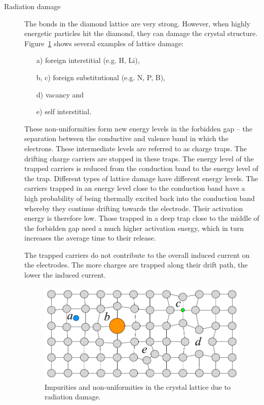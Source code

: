 \begin{description}
\item[Radiation damage]
The bonds in the diamond lattice are very strong. However, when highly energetic particles hit the diamond, they can damage the crystal structure. Figure~\ref{fig:raddamage} shows several examples of lattice damage:
\begin{enumerate}
\item[a)]foreign interstitial (e.g. H, Li),
\item[b, c)]foreign substitutional (e.g. N, P, B),
\item[d)]vacancy and
\item[e)]self interstitial.
\end{enumerate} 
These non-uniformities form new energy levels in the forbidden gap -- the separation between the conductive and valence band in which the electrons. These intermediate levels are referred to as charge traps. The drifting charge carriers are stopped in these traps. The energy level of the trapped carriers is reduced from the conduction band to the energy level of the trap. Different types of lattice damage have different energy levels. The carriers trapped in an energy level close to the conduction band have a high probability of being thermally excited back into the conduction band whereby they continue drifting towards the electrode. Their activation energy is therefore low. Those trapped in a deep trap close to the middle of the forbidden gap need a much higher activation energy, which in turn increases the average time to their release. 

The trapped carriers do not contribute to the overall induced current on the electrodes. The more charges are trapped along their drift path, the lower the induced current.

\begin{figure}[!t]
\begin{center}
\includegraphics[width=0.8\linewidth]{02_pulse_formation/pics/plots/raddamage}
\caption{Impurities and non-uniformities in the crystal lattice due to radiation damage.}
\label{fig:raddamage}
\end{center}
\end{figure}

\end{description}













